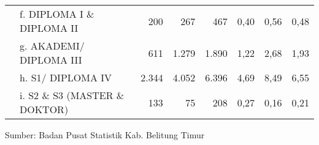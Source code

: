 {\begin{tabular}{rY{25em}rrrrrr}
      & f. DIPLOMA I \& DIPLOMA II                         &    200 &    267 &    467 &  0,40 &  0,56 &  0,48 \\
      & g. AKADEMI/ DIPLOMA III                            &    611 &  1.279 &  1.890 &  1,22 &  2,68 &  1,93 \\
      & h. S1/ DIPLOMA IV                                  &  2.344 &  4.052 &  6.396 &  4,69 &  8,49 &  6,55 \\
      & i. S2 \& S3 (MASTER \& DOKTOR)                     &    133 &     75 &    208 &  0,27 &  0,16 &  0,21 \\
    \bottomrule
\end{tabular}%

}

\vfill
Sumber: Badan Pusat Statistik Kab. Belitung Timur\par 
